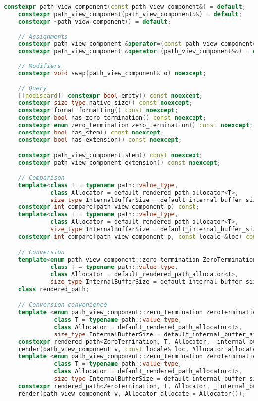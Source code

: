 \documentclass[11pt]{article}
\begin{document}
\begin{lstlisting}[language=cpp]
    constexpr path_view_component(const path_view_component&) = default;
    constexpr path_view_component(path_view_component&&) = default;
    constexpr ~path_view_component() = default;
    
    // Assignments
    constexpr path_view_component &operator=(const path_view_component&) = default;
    constexpr path_view_component &operator=(path_view_component&&) = default;
    
    // Modifiers
    constexpr void swap(path_view_component& o) noexcept;
    
    // Query
    [[nodiscard]] constexpr bool empty() const noexcept;
    constexpr size_type native_size() const noexcept;
    constexpr format formatting() const noexcept;
    constexpr bool has_zero_termination() const noexcept;
    constexpr enum zero_termination zero_termination() const noexcept;
    constexpr bool has_stem() const noexcept;
    constexpr bool has_extension() const noexcept;

    constexpr path_view_component stem() const noexcept;
    constexpr path_view_component extension() const noexcept;
    
    // Comparison
    template<class T = typename path::value_type,
             class Allocator = default_rendered_path_allocator<T>,
             size_type InternalBufferSize = default_internal_buffer_size>
    constexpr int compare(path_view_component p) const;
    template<class T = typename path::value_type,
             class Allocator = default_rendered_path_allocator<T>,
             size_type InternalBufferSize = default_internal_buffer_size>
    constexpr int compare(path_view_component p, const locale &loc) const;

    // Conversion
    template<enum path_view_component::zero_termination ZeroTermination,
             class T = typename path::value_type,
             class Allocator = default_rendered_path_allocator<T>,
             size_type InternalBufferSize = default_internal_buffer_size>
    class rendered_path;

    // Conversion convenience
    template <enum path_view_component::zero_termination ZeroTermination,
              class T = typename path::value_type,
              class Allocator = default_rendered_path_allocator<T>,
              size_type InternalBufferSize = default_internal_buffer_size>
    constexpr rendered_path<ZeroTermination, T, Allocator, _internal_buffer_size>
    render(path_view_component v, const locale& loc, Allocator allocate = Allocator());
    template <enum path_view_component::zero_termination ZeroTermination,
              class T = typename path::value_type,
              class Allocator = default_rendered_path_allocator<T>,
              size_type InternalBufferSize = default_internal_buffer_size>
    constexpr rendered_path<ZeroTermination, T, Allocator, _internal_buffer_size>
    render(path_view_component v, Allocator allocate = Allocator());


\end{lstlisting}
\end{document}
